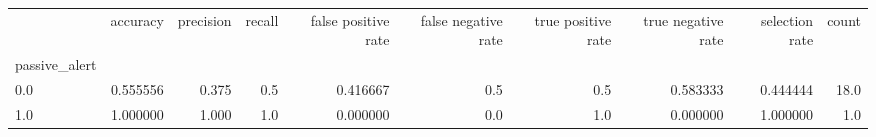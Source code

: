 \begin{tabular}{lrrrrrrrrr}
\toprule
{} &  accuracy &  precision &  recall &  false positive rate &  false negative rate &  true positive rate &  true negative rate &  selection rate &  count \\
passive\_alert &           &            &         &                      &                      &                     &                     &                 &        \\
\midrule
0.0           &  0.555556 &      0.375 &     0.5 &             0.416667 &                  0.5 &                 0.5 &            0.583333 &        0.444444 &   18.0 \\
1.0           &  1.000000 &      1.000 &     1.0 &             0.000000 &                  0.0 &                 1.0 &            0.000000 &        1.000000 &    1.0 \\
\bottomrule
\end{tabular}
